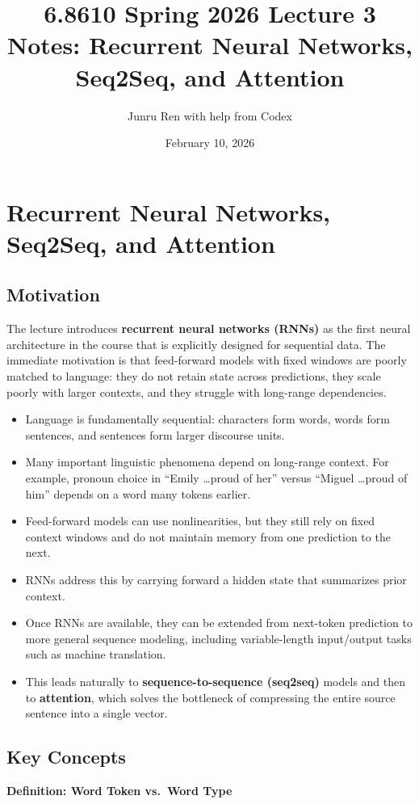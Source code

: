 \documentclass[11pt]{article}
\title{6.8610 Spring 2026 Lecture 3 Notes: Recurrent Neural Networks, Seq2Seq, and Attention}
\author{Junru Ren with help from Codex}
\date{February 10, 2026}
\begin{document}
\maketitle

\section{Recurrent Neural Networks, Seq2Seq, and Attention}

\subsection{Motivation}
The lecture introduces \textbf{recurrent neural networks (RNNs)} as the first neural architecture in the course that is explicitly designed for sequential data. The immediate motivation is that feed-forward models with fixed windows are poorly matched to language: they do not retain state across predictions, they scale poorly with larger contexts, and they struggle with long-range dependencies.

\begin{itemize}
    \item Language is fundamentally sequential: characters form words, words form sentences, and sentences form larger discourse units.
    \item Many important linguistic phenomena depend on long-range context. For example, pronoun choice in ``Emily \dots proud of her'' versus ``Miguel \dots proud of him'' depends on a word many tokens earlier.
    \item Feed-forward models can use nonlinearities, but they still rely on fixed context windows and do not maintain memory from one prediction to the next.
    \item RNNs address this by carrying forward a hidden state that summarizes prior context.
    \item Once RNNs are available, they can be extended from next-token prediction to more general sequence modeling, including variable-length input/output tasks such as machine translation.
    \item This leads naturally to \textbf{sequence-to-sequence (seq2seq)} models and then to \textbf{attention}, which solves the bottleneck of compressing the entire source sentence into a single vector.
\end{itemize}

\subsection{Key Concepts}
\textbf{Definition: Word Token vs.\ Word Type}
\end{document}

